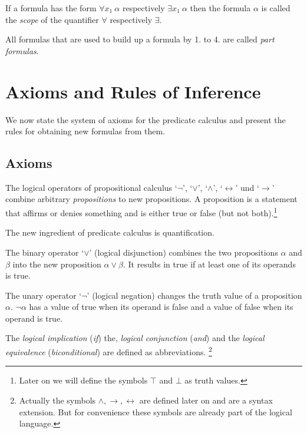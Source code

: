 \documentclass[a4paper,german,10pt,twoside]{book}
\theoremstyle{definition}
\theoremstyle{remark}
\begin{document}
\par
If a formula has the form $\forall x_1 ~ \alpha$ respectively
$\exists x_1 ~ \alpha$ then the formula $\alpha$ is called the
\emph{scope} of the quantifier $\forall$ respectively $\exists$.

\par
All formulas that are used to build up a formula by 1. to 4. are called \emph{part formulas}.



\chapter{Axioms and Rules of Inference} \label{chapter4} \hypertarget{chapter4}{}

We now state the system of axioms for the predicate calculus and present the rules for obtaining new formulas from them.

\section{Axioms} \label{chapter4_section0} \hypertarget{chapter4_section0}{}
The logical operators of propositional calculus 
\mbox{`$\neg$'}, \mbox{`$\vee$'}, \mbox{`$\wedge$'}, 
\mbox{`$\leftrightarrow$'} und \mbox{`$\rightarrow$'}
combine arbitrary \emph{propositions} to new propositions.
A proposition is a statement that affirms or denies something and is either {\glqq true\grqq} or {\glqq false\grqq} (but not both).\footnote{Later on we will define
the symbols $\top$ and $\bot$ as truth values.}

The new ingredient of predicate calculus is quantification.

\par
The binary operator \mbox{`$\vee$'} (logical disjunction) combines the
two propositions $\alpha$ and $\beta$ into the new proposition 
$\alpha \vee \beta$. It results in true if at least one of its operands is true.

\par
The unary operator \mbox{`$\neg$'} (logical negation) changes the truth
value of a proposition $\alpha$. $\neg \alpha$ has a value of true when its operand is false and a value of false when its operand is true. 

\par
The \emph{logical implication} (\emph{if}) the, \emph{logical conjunction} (\emph{and}) and the \emph{logical equivalence} (\emph{biconditional}) are defined as abbreviations.
\footnote{Actually the symbols $\wedge, \rightarrow, \leftrightarrow$ are defined later on and are a syntax extension. But for convenience these symbols are already part of the logical language.}
\end{document}
